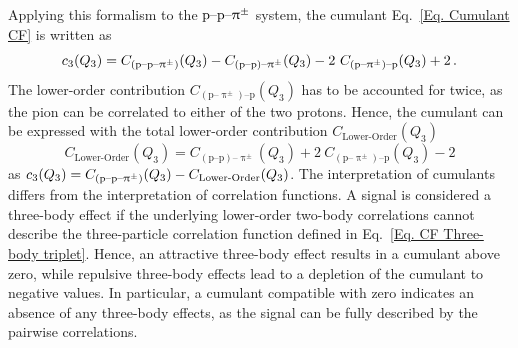 \documentclass[ALICE,manyauthors]{cernphprep}
\begin{document}
Applying this formalism to the $\text{p--p--}\uppi^\pm$ system,
the cumulant Eq.~\eqref{Eq. Cumulant CF} is written as
\begin{equation}
c_3(Q_3) = C_{(\pppiPlusMinus)}(Q_3) - C_{(\text{p--p})\text{--}\uppi^\pm}(Q_3) - 2\ C_{(\text{p--}\uppi^\pm)\text{--}\text{p}}(Q_3) + 2 \,. \label{Eq. Cumulant nice}
\end{equation}
The lower-order contribution $C_{(\text{p--}\uppi^\pm)\text{--}\text{p}}(Q_3)$ has to be accounted for twice, as the pion can be correlated to either of the two protons. Hence, the cumulant can be expressed with the total lower-order contribution $C_\text{Lower-Order}(Q_3)$
\begin{equation}
C_\text{Lower-Order}(Q_3) = C_{(\text{p--p})\text{--}\uppi^\pm}(Q_3) + 2\ C_{(\text{p--}\uppi^\pm)\text{--}\text{p}}(Q_3) - 2 \label{Eq. Three-Body Lower-order}
\end{equation}
as $c_3(Q_3) = C_{(\text{p--p--}\uppi^\pm)}(Q_3) - C_\text{Lower-Order}(Q_3)$. The interpretation of cumulants differs from the interpretation of correlation functions.  A signal is considered a three-body effect if the underlying lower-order two-body correlations cannot describe the three-particle correlation function defined in Eq.~\eqref{Eq. CF Three-body triplet}. Hence, an attractive three-body effect results in a cumulant above zero, while repulsive three-body effects lead to a depletion of the cumulant to negative values. In particular, a cumulant compatible with zero indicates an absence of any three-body effects, as the signal can be fully described by the pairwise correlations.

\end{document}
